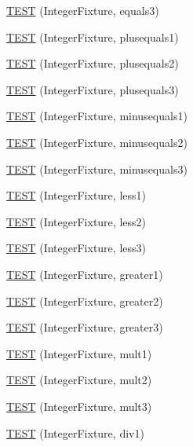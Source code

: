 \begin{DoxyCompactItemize}
\item 
\hyperlink{_test_integer_8c_09_09_a42ba62d3f14fe4b5cff95a34e8f13b6d}{T\-E\-S\-T} (Integer\-Fixture, equals3)
\item 
\hyperlink{_test_integer_8c_09_09_acf172005d59d90ec2a717dc5c24ad116}{T\-E\-S\-T} (Integer\-Fixture, plusequals1)
\item 
\hyperlink{_test_integer_8c_09_09_af4b1d9aec3f53685874e394058933ddf}{T\-E\-S\-T} (Integer\-Fixture, plusequals2)
\item 
\hyperlink{_test_integer_8c_09_09_ab38cb518840e042d883dbd9f99294cfd}{T\-E\-S\-T} (Integer\-Fixture, plusequals3)
\item 
\hyperlink{_test_integer_8c_09_09_aad7c7f1df8a17754b672fb0814028594}{T\-E\-S\-T} (Integer\-Fixture, minusequals1)
\item 
\hyperlink{_test_integer_8c_09_09_ad3f011001948053ea04e26bd5785eafb}{T\-E\-S\-T} (Integer\-Fixture, minusequals2)
\item 
\hyperlink{_test_integer_8c_09_09_a50852386400cfffa90dcea55467ee8b2}{T\-E\-S\-T} (Integer\-Fixture, minusequals3)
\item 
\hyperlink{_test_integer_8c_09_09_a7eab988ae79730f25939e28590af6fe9}{T\-E\-S\-T} (Integer\-Fixture, less1)
\item 
\hyperlink{_test_integer_8c_09_09_a7b6b4b595f6c5f3e5f7716dc68b85860}{T\-E\-S\-T} (Integer\-Fixture, less2)
\item 
\hyperlink{_test_integer_8c_09_09_a44c4b5f6952d68d45f29fd40b16aa826}{T\-E\-S\-T} (Integer\-Fixture, less3)
\item 
\hyperlink{_test_integer_8c_09_09_aba5303513d3c169fc11d047aae16656b}{T\-E\-S\-T} (Integer\-Fixture, greater1)
\item 
\hyperlink{_test_integer_8c_09_09_a897c0eb0c03a330f83d9ec2a6fdcd947}{T\-E\-S\-T} (Integer\-Fixture, greater2)
\item 
\hyperlink{_test_integer_8c_09_09_a63f2ed7e8e3587850fd28be378d8a93e}{T\-E\-S\-T} (Integer\-Fixture, greater3)
\item 
\hyperlink{_test_integer_8c_09_09_a5d30a6ab911b01849840d6d47c2ade65}{T\-E\-S\-T} (Integer\-Fixture, mult1)
\item 
\hyperlink{_test_integer_8c_09_09_a6c3d51862b488434aa06e22be78e4ab6}{T\-E\-S\-T} (Integer\-Fixture, mult2)
\item 
\hyperlink{_test_integer_8c_09_09_af7570044c2a5bf577285576ffa999335}{T\-E\-S\-T} (Integer\-Fixture, mult3)
\item 
\hyperlink{_test_integer_8c_09_09_adb0d928491fb9ea9cc626a106df71593}{T\-E\-S\-T} (Integer\-Fixture, div1)

\end{DoxyCompactItemize}
